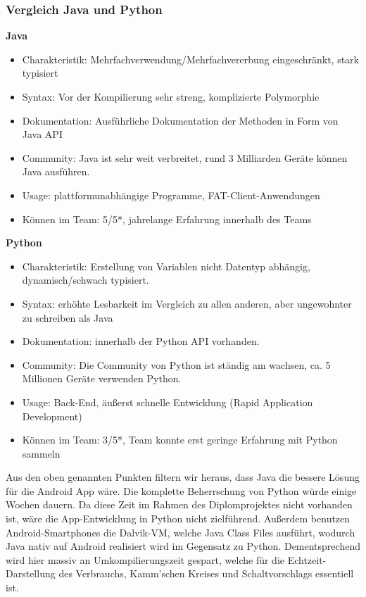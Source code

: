 \clearpage
\subsubsection{Vergleich Java und Python}
\textbf{Java\newline}
\begin{itemize}
	\item Charakteristik: Mehrfachverwendung/Mehrfachvererbung eingeschränkt, stark typisiert
	\item Syntax: Vor der Kompilierung sehr streng, komplizierte Polymorphie
	\item Dokumentation: Ausführliche Dokumentation der Methoden in Form von Java API
	\item Community: Java ist sehr weit verbreitet, rund 3 Milliarden Geräte können Java ausführen.
	\item Usage: plattformunabhängige Programme, FAT-Client-Anwendungen
	\item Können im Team: 5/5*, jahrelange Erfahrung innerhalb des Teams
\end{itemize}

\textbf{Python\newline}
\begin{itemize}
	\item Charakteristik: Erstellung von Variablen nicht Datentyp abhängig, dynamisch/schwach typisiert.
	\item Syntax: erhöhte Lesbarkeit im Vergleich zu allen anderen, aber ungewohnter zu schreiben als Java
	\item Dokumentation: innerhalb der Python API vorhanden.
	\item Community: Die Community von Python ist ständig am wachsen, ca. 5 Millionen Geräte verwenden Python.
	\item Usage: Back-End, äußerst schnelle Entwicklung (Rapid Application Development)
	\item Können im Team: 3/5*, Team konnte erst geringe Erfahrung mit Python sammeln
\end{itemize}

Aus den oben genannten Punkten filtern wir heraus, dass Java die bessere Lösung für die Android App wäre. 
Die komplette Beherrschung von Python würde einige Wochen dauern. 
Da diese Zeit im Rahmen des Diplomprojektes nicht vorhanden ist, wäre die App-Entwicklung in Python nicht zielführend. 
Außerdem benutzen Android-Smartphones die Dalvik-VM, welche Java Class Files ausführt, wodurch Java nativ auf Android realisiert wird im Gegensatz zu Python. 
Dementsprechend wird hier massiv an Umkompilierungszeit gespart, welche für die Echtzeit-Darstellung des Verbrauchs, Kamm'schen Kreises und Schaltvorschlags essentiell ist.

